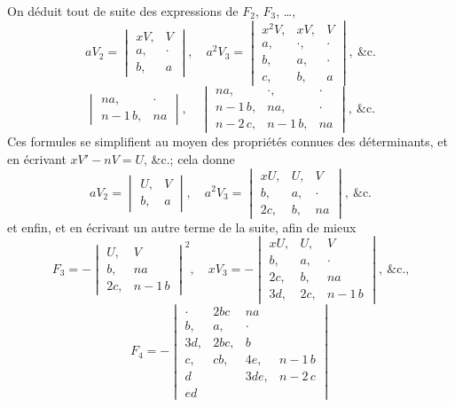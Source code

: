 \documentclass[11pt]{article}
\begin{document}
\medskip
On d\'eduit tout de suite des expressions de $F_{2}$, $F_{3}$, \ldots,
\[
aV_{2} = \begin{vmatrix} xV, & V \\ a, & \cdot \\ b, & a \end{vmatrix}\!,\quad
a^{2}V_{3} = \begin{vmatrix} x^{2}V, & xV, & V \\ a, & \cdot, & \cdot \\ b, & a, & \cdot \\ c, & b, & a \end{vmatrix}\!,\ \&\text{c.}
\]
\[
\begin{vmatrix} na, & \cdot \\ n-1\,b, & na \end{vmatrix},\quad
\begin{vmatrix} na, & \cdot, & \cdot \\ n-1\,b, & na, & \cdot \\ n-2\,c, & n-1\,b, & na \end{vmatrix},\ \&\text{c.}
\]
Ces formules se simplifient au moyen des propri\'et\'es connues des d\'eterminants, et en
\'ecrivant $xV' - nV = U$, \&c.; cela donne
\[
aV_{2} = \begin{vmatrix} U, & V \\ b, & a \end{vmatrix}\!,\quad
a^{2}V_{3} = \begin{vmatrix} xU, & U, & V \\ b, & a, & \cdot \\ 2c, & b, & na \end{vmatrix}\!,\ \&\text{c.}
\]
et enfin, et en \'ecrivant un autre terme de la suite, afin de mieux
\[
F_{3} = -\begin{vmatrix} U, & V \\ b, & na \\ 2c, & n-1\,b \end{vmatrix}^{2},\quad
xV_{3} = -\begin{vmatrix} xU, & U, & V \\ b, & a, & \cdot \\ 2c, & b, & na \\ 3d, & 2c, & n-1\,b \end{vmatrix},\ \&\text{c.,}
\]
\[
F_{4} = -\begin{vmatrix} \cdot & 2bc & na \\ b, & a, & \cdot \\ 3d, & 2bc, & b \\ c, & cb, & 4e, & n-1\,b \\ d & & 3de, & n-2\,c \\ e d & & & \end{vmatrix}
\]
\end{document}
